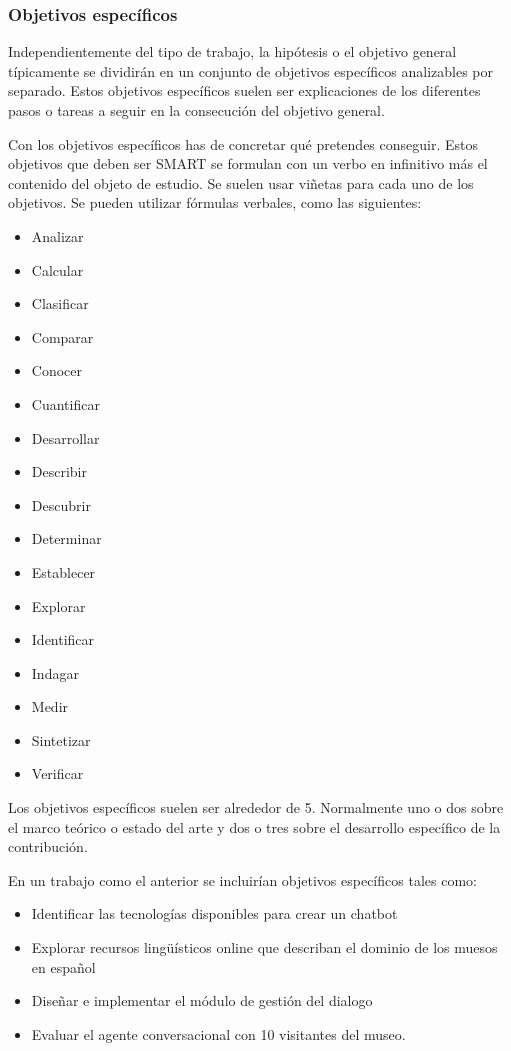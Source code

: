 \subsubsection{Objetivos específicos}

Independientemente del tipo de trabajo, la hipótesis o el objetivo general típicamente se dividirán en un conjunto de objetivos específicos analizables por separado. Estos objetivos específicos suelen ser explicaciones de los diferentes pasos o tareas a seguir en la consecución del objetivo general.

Con los objetivos específicos has de concretar qué pretendes conseguir. Estos objetivos que deben ser SMART se formulan con un verbo en infinitivo más el contenido del objeto de estudio. Se suelen usar viñetas para cada uno de los objetivos. Se pueden utilizar fórmulas verbales, como las siguientes:
\begin{itemize}
	\item Analizar
	\item Calcular
	\item Clasificar
	\item Comparar
	\item Conocer
	\item Cuantificar
	\item Desarrollar
	\item Describir
	\item Descubrir
	\item Determinar
	\item Establecer
	\item Explorar
	\item Identificar
	\item Indagar
	\item Medir
	\item Sintetizar
	\item Verificar
\end{itemize}

Los objetivos específicos suelen ser alrededor de 5. Normalmente uno o dos sobre el marco teórico o estado del arte y dos o tres sobre el desarrollo específico de la contribución.

En un trabajo como el anterior se incluirían objetivos específicos tales como:
\begin{itemize}
\item Identificar las tecnologías disponibles para crear un chatbot
\item Explorar recursos lingüísticos online que describan el dominio de los muesos en español
\item Diseñar e implementar el módulo de gestión del dialogo
\item Evaluar el agente conversacional con 10 visitantes del museo.
\end{itemize}

